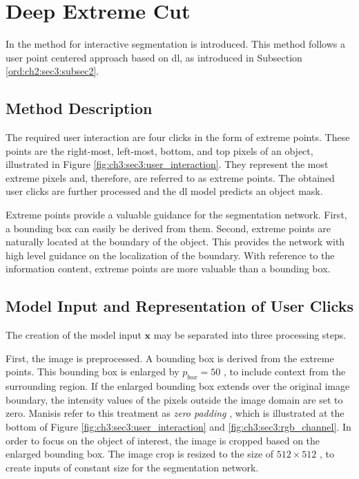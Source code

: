 
\section{Deep Extreme Cut}\label{ord:ch3:sec3}

In \cite{Man18-DEXTR} the  method for interactive segmentation is introduced.
This method follows a user point centered approach based on \gls{dl}, as introduced in Subsection \ref{ord:ch2:sec3:subsec2}.

\subsection{Method Description}\label{ord:ch3:sec3:subsec1}

The required user interaction are four clicks in the form of extreme points.
These points are the right-most, left-most, bottom, and top pixels of an object, illustrated in Figure \ref{fig:ch3:sec3:user_interaction}.
They represent the most extreme pixels and, therefore, are referred to as extreme points.
The obtained user clicks are further processed and the \gls{dl} model predicts an object mask.

Extreme points provide a valuable guidance for the segmentation network.
First, a bounding box can easily be derived from them.
Second, extreme points are naturally located at the boundary of the object.
This provides the network with high level guidance on the localization of the boundary.
With reference to the information content, extreme points are more valuable than a bounding box.

\subsection{Model Input and Representation of User Clicks}\label{ord:ch3:sec3:subsec2}

The creation of the model input $\textbf{x}$ may be separated into three processing steps.

First, the image is preprocessed. 
A bounding box is derived from the extreme points. 
This bounding box is enlarged by $p_{{box}} = 50 $ , to include context from the surrounding region.
If the enlarged bounding box extends over the original image boundary, the intensity values of the pixels outside the image domain are set to zero.
Manisis \etal refer to this treatment as \textit{zero padding} \cite{Man18-DEXTR}, which is illustrated at the bottom of Figure \ref{fig:ch3:sec3:user_interaction} and \ref{fig:ch3:sec3:rgb_channel}.
In order to focus on the object of interest, the image is cropped based on the enlarged bounding box.
The image crop is resized to the size of $512 \times 512$ , to create inputs of constant size for the segmentation network.

